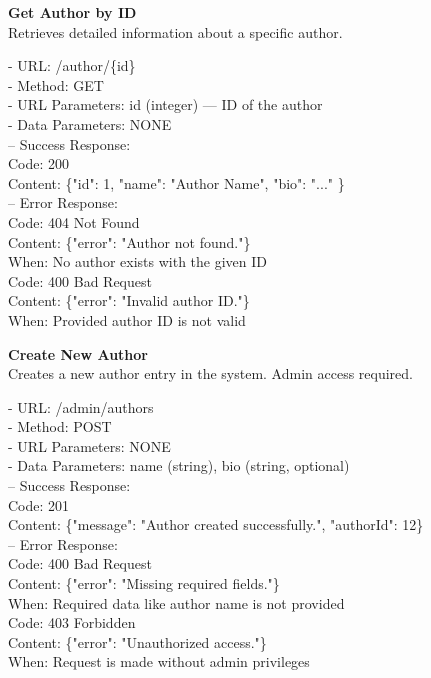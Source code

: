 \begin{flushleft}
    \textbf{Get Author by ID} \\
    Retrieves detailed information about a specific author.

    - URL: /author/\{id\} \\
    - Method: GET \\
    - URL Parameters: id (integer) — ID of the author \\
    - Data Parameters: NONE \\
    – Success Response: \\
    Code: 200 \\
    Content: \{"id": 1, "name": "Author Name", "bio": "..." \} \\
    – Error Response: \\
    Code: 404 Not Found \\
    Content: \{"error": "Author not found."\} \\
    When: No author exists with the given ID \\
    Code: 400 Bad Request \\
    Content: \{"error": "Invalid author ID."\} \\
    When: Provided author ID is not valid
\end{flushleft}

\begin{flushleft}
    \textbf{Create New Author} \\
    Creates a new author entry in the system. Admin access required.

    - URL: /admin/authors \\
    - Method: POST \\
    - URL Parameters: NONE \\
    - Data Parameters: name (string), bio (string, optional) \\
    – Success Response: \\
    Code: 201 \\
    Content: \{"message": "Author created successfully.", "authorId": 12\} \\
    – Error Response: \\
    Code: 400 Bad Request \\
    Content: \{"error": "Missing required fields."\} \\
    When: Required data like author name is not provided \\
    Code: 403 Forbidden \\
    Content: \{"error": "Unauthorized access."\} \\
    When: Request is made without admin privileges
\end{flushleft}

